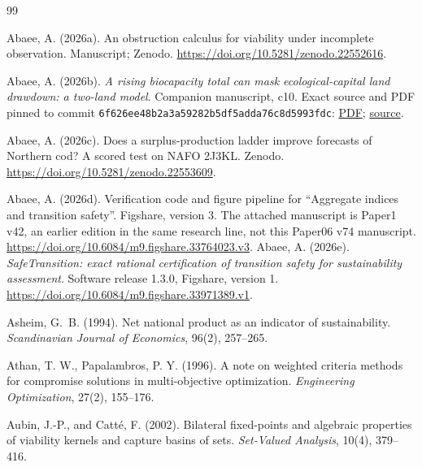 \documentclass[preprint,11pt,authoryear]{elsarticle}
\theoremstyle{definition}
\theoremstyle{remark}
\begin{document}
\begin{thebibliography}{99}
\makeatletter\renewcommand{\@biblabel}[1]{}\makeatother

 Abaee, A. (2026a). An obstruction calculus for viability under incomplete observation. Manuscript; Zenodo. \url{https://doi.org/10.5281/zenodo.22552616}.

 Abaee, A. (2026b). \emph{A rising biocapacity total can mask ecological-capital land drawdown: a two-land model}. Companion manuscript, c10. Exact source and PDF pinned to commit \texttt{6f626ee48b2a3a59282b5df5adda76c8d5993fdc}: \href{https://github.com/MIKEAA2020/general-sustainability/blob/6f626ee48b2a3a59282b5df5adda76c8d5993fdc/agent%202%20productivity%20illusion/output_v45_ecomod_continued_10_gemini38_v4base_si_review_20261026/ecomod_continued_10.pdf}{PDF}; \href{https://github.com/MIKEAA2020/general-sustainability/blob/6f626ee48b2a3a59282b5df5adda76c8d5993fdc/agent%202%20productivity%20illusion/output_v45_ecomod_continued_10_gemini38_v4base_si_review_20261026/ecomod_continued_10.tex}{source}.

 Abaee, A. (2026c). Does a surplus-production ladder improve forecasts of Northern cod? A scored test on NAFO 2J3KL. Zenodo. \url{https://doi.org/10.5281/zenodo.22553609}.

 Abaee, A. (2026d). Verification code and figure pipeline for ``Aggregate indices and transition safety''. Figshare, version 3. The attached manuscript is Paper1 v42, an earlier edition in the same research line, not this Paper06 v74 manuscript. \url{https://doi.org/10.6084/m9.figshare.33764023.v3}.
 Abaee, A. (2026e). \emph{SafeTransition: exact rational certification of transition safety for sustainability assessment}. Software release 1.3.0, Figshare, version 1. \url{https://doi.org/10.6084/m9.figshare.33971389.v1}.

 Asheim, G.~B. (1994). Net national product as an indicator of sustainability. \emph{Scandinavian Journal of Economics}, 96(2), 257--265.

 Athan, T. W., Papalambros, P. Y. (1996). A note on weighted criteria methods for compromise solutions in multi-objective optimization. \emph{Engineering Optimization}, 27(2), 155--176.

 Aubin, J.-P., and Catt\'e, F. (2002). Bilateral fixed-points and algebraic properties of viability kernels and capture basins of sets. \emph{Set-Valued Analysis}, 10(4), 379--416.


\end{thebibliography}
\end{document}
